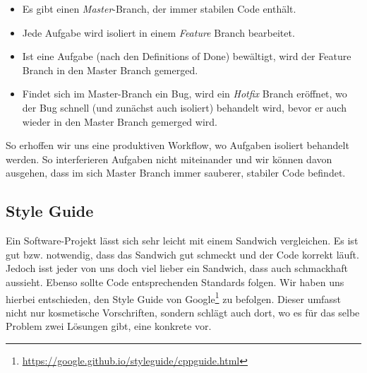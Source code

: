 \begin{itemize}
  \item Es gibt einen \emph{Master}-Branch, der immer stabilen Code enthält.
  \item Jede Aufgabe wird isoliert in einem \emph{Feature} Branch bearbeitet.
  \item Ist eine Aufgabe (nach den Definitions of Done) bewältigt, wird der
    Feature Branch in den Master Branch gemerged.
  \item Findet sich im Master-Branch ein Bug, wird ein \emph{Hotfix} Branch
    eröffnet, wo der Bug schnell (und zunächst auch isoliert) behandelt wird,
    bevor er auch wieder in den Master Branch gemerged wird.
\end{itemize}

So erhoffen wir uns eine produktiven Workflow, wo Aufgaben isoliert behandelt
werden. So interferieren Aufgaben nicht miteinander und wir können davon
ausgehen, dass im sich Master Branch immer sauberer, stabiler Code befindet.

\subsection{Style Guide}

Ein Software-Projekt lässt sich sehr leicht mit einem Sandwich vergleichen. Es
ist gut bzw. notwendig, dass das Sandwich gut schmeckt und der Code korrekt
läuft. Jedoch isst jeder von uns doch viel lieber ein Sandwich, dass auch
schmackhaft aussieht. Ebenso sollte Code entsprechenden Standards folgen. Wir
haben uns hierbei entschieden, den Style Guide von Google\footnote{\url{https://google.github.io/styleguide/cppguide.html}} zu
befolgen. Dieser umfasst nicht nur kosmetische Vorschriften, sondern schlägt
auch dort, wo es für das selbe Problem zwei Lösungen gibt, eine konkrete vor.

